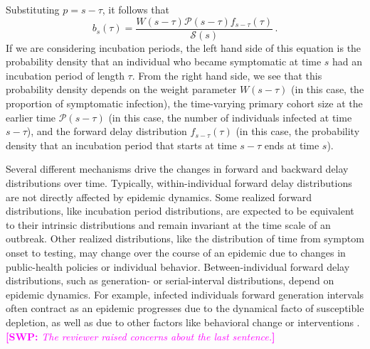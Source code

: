\documentclass[12pt]{article}
\newcommand{\comment}{\showcomment}
\newcommand{\showcomment}[3]{\textcolor{#1}{\textbf{[#2: }\textsl{#3}\textbf{]}}}
\newcommand{\swp}[1]{\comment{magenta}{SWP}{#1}}
\newcommand{\psymp}{\ensuremath{p}} %
\newcommand{\ssymp}{\ensuremath{s}} %
\newcommand{\psize}{{\mathcal P}} %
\newcommand{\ssize}{{\mathcal S}} %
\begin{document}
Substituting $\psymp=\ssymp-\tau$, it follows that
\begin{equation}
b_\ssymp(\tau)= \frac{W(\ssymp-\tau) \psize(\ssymp-\tau) f_{\ssymp-\tau} (\tau)}{\ssize(\ssymp)}\,.
\label{eq:backward}
\end{equation}
If we are considering incubation periods, the left hand side of
this equation is the probability density that an individual
who became symptomatic at time $\ssymp$ had an incubation period of
length $\tau$.
From the right hand side, we see that this probability density depends on the weight parameter $W(\ssymp-\tau)$ (in this case, the proportion of symptomatic infection),
the time-varying primary cohort size at the earlier time $\psize(\ssymp-\tau)$ (in this case, the number of individuals infected at time $\ssymp-\tau$),
and the forward delay distribution $f_{\ssymp-\tau}(\tau)$ (in this case, the probability density that an incubation period that starts at time $\ssymp-\tau$ ends at time $\ssymp$).

Several different mechanisms drive the changes in forward and backward delay distributions over time.
Typically, within-individual forward delay distributions are not directly affected by epidemic dynamics.
Some realized forward distributions, like incubation period distributions, are expected to be equivalent to their intrinsic distributions and remain invariant at the time scale of an outbreak.
Other realized distributions, like the distribution of time from symptom onset to testing, may change over the course of an epidemic due to changes in public-health policies or individual behavior.
Between-individual forward delay distributions, such as generation- or serial-interval distributions, depend on epidemic dynamics.
For example, infected individuals forward generation intervals often contract as an epidemic progresses due to the dynamical facto of susceptible depletion, as well as due to other factors like behavioral change or interventions \citep{champredon2015intrinsic}.
\swp{The reviewer raised concerns about the last sentence.}
\end{document}
